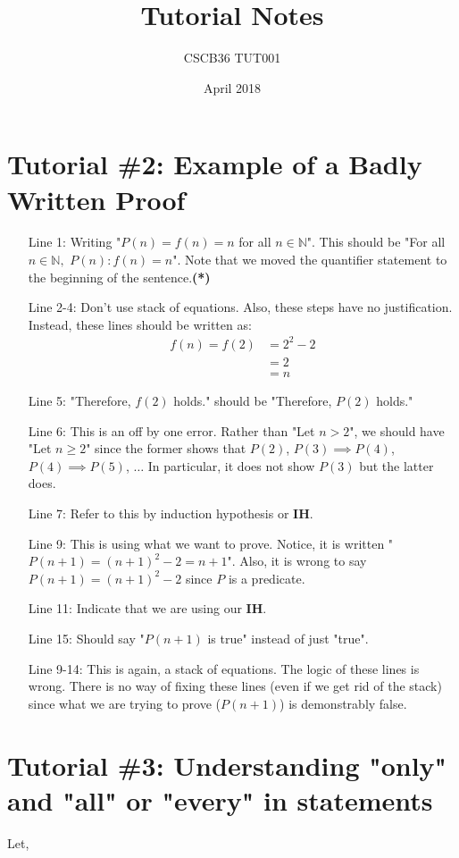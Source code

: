 \documentclass{article}
\title{Tutorial Notes}
\author{CSCB36 TUT001}
\date{April 2018}
\begin{document}
\maketitle

\section*{Tutorial \#2: Example of a Badly Written Proof}

\begin{enumerate}
	\item[Line 1:] Writing "$P(n) = f(n) = n$ for all $n\in\mathbb{N}$". This should be "For all $n\in\mathbb{N},$ $P(n): f(n) = n$". Note that we moved the quantifier statement to the beginning of
	the sentence.\textbf{(*)}
	\item[Line 2-4:] Don't use stack of equations. Also, these steps have no justification. Instead, these lines should be written as:
		\begin{align*}
			f(n) = f(2) &= 2^2 - 2 \\
				&= 2 \\
				&= n
		\end{align*}
	\item[Line 5:] "Therefore, $f(2)$ holds." should be "Therefore, $P(2)$ holds."
	\item[Line 6:] This is an off by one error. Rather than "Let $n>2$", we should have "Let $n\geq 2$" since the former shows that $P(2)$, $P(3)\implies P(4)$, $P(4)\implies P(5)$, $\hdots$
		In particular, it does not show $P(3)$ but the latter does.
	\item[Line 7:] Refer to this by induction hypothesis or \textbf{IH}.
	\item[Line 9:] This is using what we want to prove. Notice, it is written "$P(n+1) = (n+1)^2-2 = n+1$". Also, it is wrong to say $P(n+1) = (n+1)^2-2$ since $P$ is a predicate.
	\item[Line 11:] Indicate that we are using our \textbf{IH}.
	\item[Line 15:] Should say "$P(n+1)$ is true" instead of just "true".
	\item[Line 9-14:] This is again, a stack of equations. The logic of these lines is wrong.
		There is no way of fixing these lines (even if we get rid of the stack) since what we are trying to prove ($P(n+1)$) is demonstrably false.
\end{enumerate}

\section*{Tutorial \#3: Understanding "only" and "all" or "every" in statements}

Let,
\begin{align*}
\end{align*}
\end{document}
